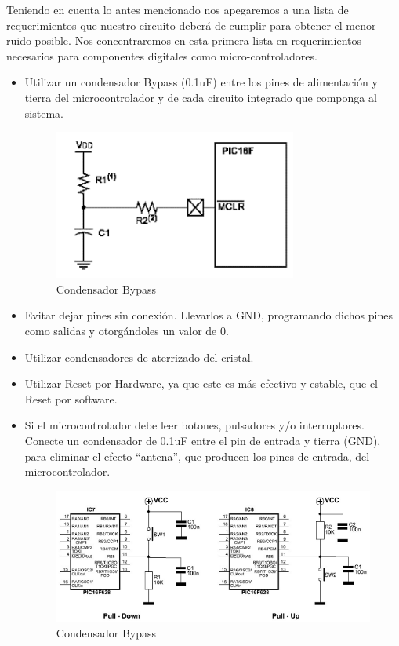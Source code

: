 Teniendo en cuenta lo antes mencionado nos apegaremos a una lista de requerimientos que nuestro circuito deberá de cumplir para obtener el menor ruido posible. Nos concentraremos en esta primera lista en requerimientos necesarios para componentes digitales como micro-controladores.

\begin{itemize} 
\item Utilizar un condensador Bypass (0.1uF) entre los pines de alimentación y tierra del microcontrolador y de cada circuito integrado que componga al sistema.
\begin{figure}[H]
\centering
\includegraphics[width=8cm]{capitulo2/figs/fig3.png}
\caption{Condensador Bypass}
\end{figure}

\item Evitar dejar pines sin conexión. Llevarlos a GND, programando dichos pines como salidas y otorgándoles un valor de 0.

\item Utilizar condensadores de aterrizado del cristal.

\item Utilizar Reset por Hardware, ya que este es más efectivo y estable, que el Reset por software.

\item Si el microcontrolador debe leer botones, pulsadores y/o interruptores. Conecte un condensador de 0.1uF entre el pin de entrada y tierra (GND), para eliminar el efecto “antena”, que producen los pines de entrada, del microcontrolador.
\begin{figure}[H]
\centering
\includegraphics[width=12cm]{capitulo2/figs/fig4.png}
\caption{Condensador Bypass}
\end{figure}

\end{itemize}

